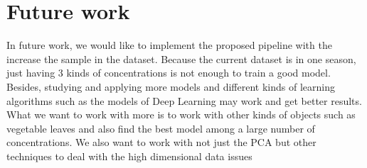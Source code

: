 \section{Future work} \label{section:future-work}

In future work, we would like to implement the proposed pipeline with  the increase the sample in the dataset. Because the current dataset is in one season, just having 3 kinds of concentrations is not enough to train a good model. Besides, studying and applying more models and different kinds of learning algorithms such as the models of Deep Learning may work and get better results. What we want to work with more is to work with other kinds of objects such as vegetable leaves and also find the best model among a large number of concentrations. We also want to work with not just the PCA but other techniques to deal with the high dimensional data issues